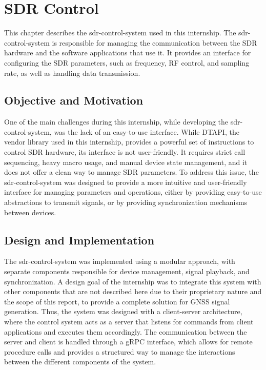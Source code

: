 
%

\chapter{SDR Control}
\label{cha:sdr-control}


This chapter describes the \gls{sdr-control-system} used in this internship.
The \gls{sdr-control-system} is responsible for managing the communication
between the \gls{SDR} hardware and the software applications that use it.
It provides an interface for configuring the \gls{SDR} parameters, such as
frequency, \gls{RF} control, and sampling rate, as well as handling data
transmission.

\section{Objective and Motivation}
\label{sec:sdr-objective-and-motivation}

One of the main challenges during this internship, while developing the
\gls{sdr-control-system}, was the lack of an easy-to-use interface. While
\gls{DTAPI}, the vendor library used in this internship, provides a powerful
set of instructions to control \gls{SDR} hardware, its interface is not
user-friendly. It requires strict call sequencing, heavy macro usage, and
manual device state management, and it does not offer a clean way to manage
\gls{SDR} parameters. To address this
issue, the \gls{sdr-control-system} was designed to provide a more intuitive
and user-friendly interface for managing parameters and operations, either by
providing easy-to-use abstractions to transmit signals, or by providing
synchronization mechanisms between devices.

\section{Design and Implementation}
\label{sec:sdr-design-and-implementation}

The \gls{sdr-control-system} was implemented using a modular approach, with
separate components responsible for device management, signal playback, and
synchronization. A design goal of the internship was to integrate this
system with other components that are not described here due to their
proprietary nature and the scope of this report, to provide a complete solution
for \gls{GNSS} signal generation. Thus, the system was designed with a
client-server
architecture, where the control system acts as a server that listens for
commands from client applications and executes them accordingly. The
communication between the server and client is handled through a \gls{gRPC}
interface, which allows for remote procedure calls and provides a structured
way to manage the interactions between the different components of the system.

